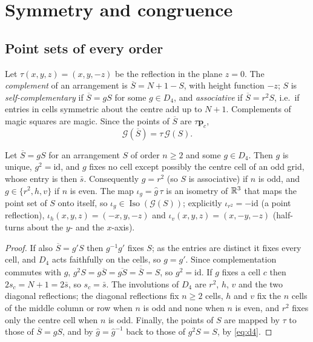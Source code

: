 \section{Symmetry and congruence}
\label{sec:symmetry}
\label{sec:symmetry-congruence}

\subsection{Point sets of every order}
\label{sec:pointsets}

Let $\tau(x,y,z)=(x,y,-z)$ be the reflection in the plane $z=0$.
The \emph{complement} of an arrangement is $\overline S=N+1-S$, with height function $-z$; $S$ is \emph{self-complementary} if $\overline S=gS$ for some $g\in D_4$, and \emph{associative} if $\overline S=r^2S$, i.e.\ if entries in cells symmetric about the centre add up to $N+1$.
Complements of magic squares are magic.
Since the points of $\overline S$ are $\tau\mathbf p_c$,
\begin{equation}
\mathcal G(\overline S)=\tau\,\mathcal G(S).
\label{eq:complement}
\end{equation}

\begin{lemma}
\label{lem:selfcomp}
Let $\overline S=gS$ for an arrangement $S$ of order $n\ge2$ and some $g\in D_4$. Then $g$ is unique, $g^2=\mathrm{id}$, and $g$ fixes no cell except possibly the centre cell of an odd grid, whose entry is then $\bar s$.
Consequently $g=r^2$ (so $S$ is associative) if $n$ is odd, and $g\in\{r^2,h,v\}$ if $n$ is even.
The map $\iota_g=\hat g\,\tau$ is an isometry of $\mathbb{R}^3$ that maps the point set of $S$ onto itself, so $\iota_g\in\operatorname{Iso}(\mathcal G(S))$; explicitly $\iota_{r^2}=-\mathrm{id}$ (a point reflection), $\iota_h(x,y,z)=(-x,y,-z)$ and $\iota_v(x,y,z)=(x,-y,-z)$ (half-turns about the $y$- and the $x$-axis).
\end{lemma}

\begin{proof}
If also $\overline S=g'S$ then $g^{-1}g'$ fixes $S$; as the entries are distinct it fixes every cell, and $D_4$ acts faithfully on the cells, so $g=g'$.
Since complementation commutes with $g$, $g^2S=g\overline S=\overline{gS}=\overline{\overline S}=S$, so $g^2=\mathrm{id}$.
If $g$ fixes a cell $c$ then $2s_c=N+1=2\bar s$, so $s_c=\bar s$.
The involutions of $D_4$ are $r^2$, $h$, $v$ and the two diagonal reflections; the diagonal reflections fix $n\ge2$ cells, $h$ and $v$ fix the $n$ cells of the middle column or row when $n$ is odd and none when $n$ is even, and $r^2$ fixes only the centre cell when $n$ is odd.
Finally, the points of $S$ are mapped by $\tau$ to those of $\overline S=gS$, and by $\hat g=\hat g^{-1}$ back to those of $g^2S=S$, by \eqref{eq:d4}.
\end{proof}

